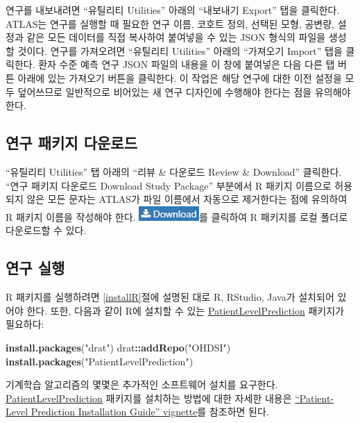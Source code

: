 \documentclass[10.5pt]{book}
\newenvironment{Shaded}{\begin{snugshade}}{\end{snugshade}}
\newcommand{\KeywordTok}[1]{\textcolor[rgb]{0.13,0.29,0.53}{\textbf{#1}}}
\newcommand{\StringTok}[1]{\textcolor[rgb]{0.31,0.60,0.02}{#1}}
\newcommand{\OperatorTok}[1]{\textcolor[rgb]{0.81,0.36,0.00}{\textbf{#1}}}
\newcommand{\NormalTok}[1]{#1}
\theoremstyle{definition}
\theoremstyle{definition}
\theoremstyle{definition}
\theoremstyle{remark}
\begin{document}
연구를 내보내려면 ``유틸리티 Utilities'' 아래의 ``내보내기 Export'' 탭을
클릭한다. ATLAS는 연구를 실행할 때 필요한 연구 이름, 코호트 정의, 선택된
모형, 공변량, 설정과 같은 모든 데이터를 직접 복사하여 붙여넣을 수 있는
JSON 형식의 파일을 생성할 것이다. 연구를 가져오려면 ``유틸리티
Utilities'' 아래의 ``가져오기 Import'' 탭을 클릭한다. 환자 수준 예측
연구 JSON 파일의 내용을 이 창에 붙여넣은 다음 다른 탭 버튼 아래에 있는
가져오기 버튼을 클릭한다. 이 작업은 해당 연구에 대한 이전 설정을 모두
덮어쓰므로 일반적으로 비어있는 새 연구 디자인에 수행해야 한다는 점을
유의해야 한다.

\subsection{연구 패키지 다운로드}\label{--}

``유틸리티 Utilities'' 탭 아래의 ``리뷰 \& 다운로드 Review \& Download''
클릭한다. ``연구 패키지 다운로드 Download Study Package'' 부분에서 R
패키지 이름으로 허용되지 않은 모든 문자는 ATLAS가 파일 이름에서 자동으로
제거한다는 점에 유의하여 R 패키지 이름을 작성해야 한다.
\includegraphics{images/PatientLevelPrediction/download.png}를 클릭하여
R 패키지를 로컬 폴더로 다운로드할 수 있다.

\subsection{연구 실행}\label{-}

R 패키지를 실행하려면 \ref{installR}절에 설명된 대로 R, RStudio, Java가
설치되어 있어야 한다. 또한, 다음과 같이 R에 설치할 수 있는
\href{https://ohdsi.github.io/PatientLevelPrediction/}{PatientLevelPrediction}
패키지가 필요하다:

\begin{Shaded}
\begin{Highlighting}[]
\KeywordTok{install.packages}\NormalTok{(}\StringTok{"drat"}\NormalTok{)}
\NormalTok{drat}\OperatorTok{::}\KeywordTok{addRepo}\NormalTok{(}\StringTok{"OHDSI"}\NormalTok{)}
\KeywordTok{install.packages}\NormalTok{(}\StringTok{"PatientLevelPrediction"}\NormalTok{)}
\end{Highlighting}
\end{Shaded}

기계학습 알고리즘의 몇몇은 추가적인 소프트웨어 설치를 요구한다.
\href{https://ohdsi.github.io/PatientLevelPrediction/}{PatientLevelPrediction}
패키지를 설치하는 방법에 대한 자세한 내용은
\href{https://ohdsi.github.io/PatientLevelPrediction/articles/InstallationGuide.html}{``Patient-Level
Prediction Installation Guide'' vignette}를 참조하면 된다.
\end{document}
